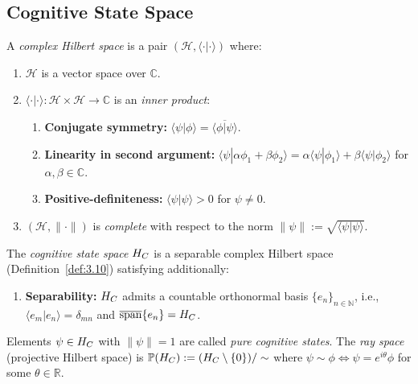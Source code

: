 \subsection{Cognitive State Space}
\label{sec:ch3:cognitive}

\begin{definition}
\label{def:3.10}
A \emph{complex Hilbert space} is a pair $(\mathcal{H}, \langle\cdot|\cdot\rangle)$
where:
\begin{enumerate}
  \item[(H1)] $\mathcal{H}$ is a vector space over $\mathbb{C}$.
  \item[(H2)] $\langle\cdot|\cdot\rangle : \mathcal{H} \times \mathcal{H}
    \to \mathbb{C}$ is an \emph{inner product}:
    \begin{enumerate}
      \item[(IP1)] \textbf{Conjugate symmetry:}
        $\langle\psi|\phi\rangle = \overline{\langle\phi|\psi\rangle}$.
      \item[(IP2)] \textbf{Linearity in second argument:}
        $\langle\psi|\alpha\phi_1 + \beta\phi_2\rangle
        = \alpha\langle\psi|\phi_1\rangle + \beta\langle\psi|\phi_2\rangle$
        for $\alpha, \beta \in \mathbb{C}$.
      \item[(IP3)] \textbf{Positive-definiteness:}
        $\langle\psi|\psi\rangle > 0$ for $\psi \neq 0$.
    \end{enumerate}
  \item[(H3)] $(\mathcal{H}, \|\cdot\|)$ is \emph{complete} with respect to
    the norm $\|\psi\| := \sqrt{\langle\psi|\psi\rangle}$.
\end{enumerate}
\end{definition}

\begin{definition}
\label{def:3.11}
The \emph{cognitive state space} $H_C$ is a separable complex Hilbert
space (Definition~\ref{def:3.10}) satisfying additionally:
\begin{enumerate}
  \item[(S1)] \textbf{Separability:} $H_C$ admits a countable orthonormal
    basis $\{e_n\}_{n \in \mathbb{N}}$, i.e.,
    $\langle e_m | e_n \rangle = \delta_{mn}$ and
    $\overline{\mathrm{span}}\{e_n\} = H_C$.
\end{enumerate}
Elements $\psi \in H_C$ with $\|\psi\| = 1$ are called \emph{pure
cognitive states}.  The \emph{ray space} (projective Hilbert space) is
$\mathbb{P}(H_C) := (H_C \setminus \{0\})/\sim$ where
$\psi \sim \phi \iff \psi = e^{i\theta}\phi$ for some
$\theta \in \mathbb{R}$.
\end{definition}

